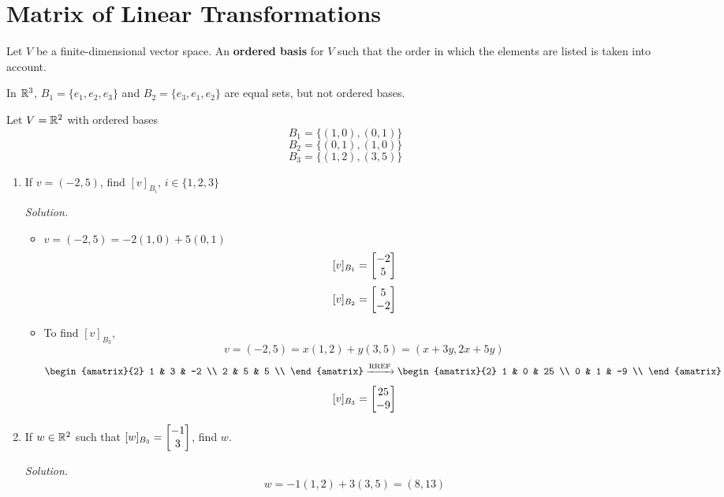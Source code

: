 \newpage
\section{Matrix of Linear Transformations}
\begin{definition}
Let $V$ be a finite-dimensional vector space. An \textbf{ordered basis} for $V$ such that the order in which the elements are listed is taken into account.
\end{definition}

\begin{example}
In $\mathbb{R}^3$, $B_1 = \{e_1, e_2, e_3\}$ and $B_2 = \{e_3, e_1, e_2\}$ are equal sets, but not ordered bases.
\end{example}

\begin{example}
Let $V = \mathbb{R}^2$ with ordered bases
$$B_1 = \{(1, 0), (0, 1)\}$$
$$B_2 = \{(0, 1), (1, 0)\}$$
$$B_3 = \{(1, 2), (3, 5)\}$$
\begin{enumerate}
    \item If $v = (-2, 5)$, find $[v]_{B_i}$, $i \in \{1, 2, 3\}$

    \textit{Solution.} 
    \leavevmode
    \begin{itemize}
        \item $v = (-2, 5) = -2(1, 0) + 5(0, 1)$
        $$[v]_{B_1} = \begin{bmatrix} -2 \\ 5 \end{bmatrix}$$
        $$[v]_{B_2} = \begin{bmatrix} 5 \\ -2 \end{bmatrix}$$

        \item To find $[v]_{B_3}$,
        $$v = (-2, 5) = x(1, 2) + y(3, 5) = (x + 3y, 2x + 5y)$$
        $$\begin{amatrix}{2}
            1 & 3 & -2 \\
            2 & 5 & 5 \\
        \end{amatrix} \xrightarrow{\text{RREF}} 
        \begin{amatrix}{2}
            1 & 0 & 25 \\
            0 & 1 & -9 \\
        \end{amatrix}$$
        $$[v]_{B_3} = \begin{bmatrix} 25 \\ -9 \end{bmatrix}$$
    \end{itemize}

    \item If $w \in \mathbb{R}^2$ such that $[w]_{B_3} = \begin{bmatrix} -1 \\ 3 \end{bmatrix}$, find $w$.

    \textit{Solution.} 
    $$w = -1(1, 2) + 3(3, 5) = \boxed{(8, 13)}$$
\end{enumerate}
\end{example}

